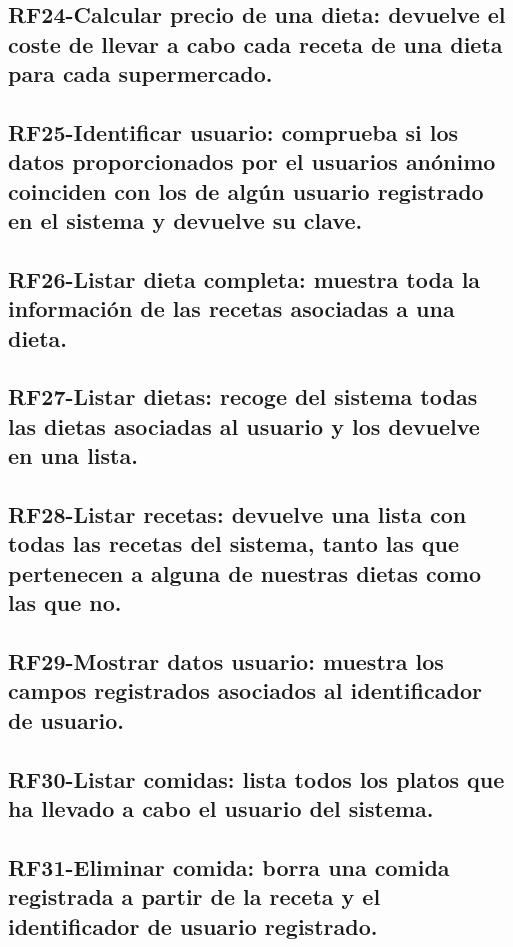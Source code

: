 \documentclass[a4paper,12pt]{report}
\begin{document}
\subsection{\textbf{RF24-Calcular precio de una dieta}: devuelve el coste de llevar a cabo cada receta de una dieta para cada supermercado.}
\label{sec-2-2-24}

\subsection{\textbf{RF25-Identificar usuario}: comprueba si los datos proporcionados por el usuarios anónimo coinciden con los de algún usuario registrado en el sistema y devuelve su clave.}
\label{sec-2-2-25}

\subsection{\textbf{RF26-Listar dieta completa}: muestra toda la información de las recetas asociadas a una dieta.}
\label{sec-2-2-26}

\subsection{\textbf{RF27-Listar dietas}: recoge del sistema todas las dietas asociadas al usuario y los devuelve en una lista.}
\label{sec-2-2-27}

\subsection{\textbf{RF28-Listar recetas}: devuelve una lista con todas las recetas del sistema, tanto las que pertenecen a alguna de nuestras dietas como las que no.}
\label{sec-2-2-28}

\subsection{\textbf{RF29-Mostrar datos usuario}: muestra los campos registrados asociados al identificador de usuario.}
\label{sec-2-2-29}

\subsection{\textbf{RF30-Listar comidas}: lista todos los platos que ha llevado a cabo el usuario del sistema.}
\label{sec-2-2-30}

\subsection{\textbf{RF31-Eliminar comida}: borra una comida registrada a partir de la receta y el identificador de usuario registrado.}
\label{sec-2-2-31}
\end{document}

